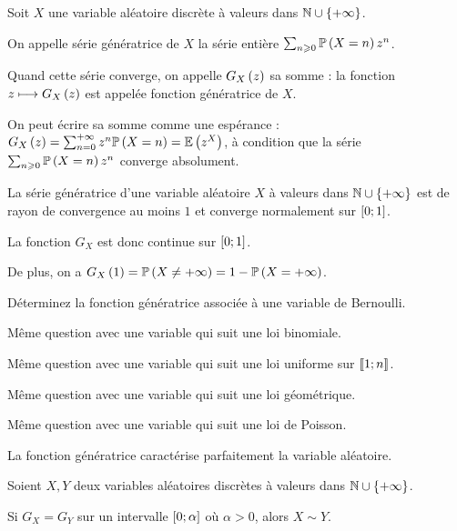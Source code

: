 \begin{defi}
Soit \(X\) une variable aléatoire discrète à valeurs dans \(\mathbb{N}\cup\left\lbrace+\infty\right\rbrace\).

On appelle série génératrice de \(X\) la série entière \(\sum_{n\geqslant0}\mathbb{P}\left(X=n\right)z^n\).

Quand cette série converge, on appelle \(G_X\left(z\right)\) sa somme : la fonction \(z\longmapsto G_X\left(z\right)\) est appelée fonction génératrice de \(X\).
\end{defi}

On peut écrire sa somme comme une espérance : \(G_X\left(z\right)=\sum_{n=0}^{+\infty}z^n\mathbb{P}\left(X=n\right)=\operatorname{\mathbb{E}}\left(z^X\right)\), à condition que la série \(\sum_{n\geqslant0}\mathbb{P}\left(X=n\right)z^n\) converge absolument.

\begin{prop}
La série génératrice d'une variable aléatoire \(X\) à valeurs dans \(\mathbb{N}\cup\left\lbrace+\infty\right\rbrace\) est de rayon de convergence au moins \(1\) et converge normalement sur \(\left[0;1\right]\).

La fonction \(G_X\) est donc continue sur \(\left[0;1\right]\).

De plus, on a \(G_X\left(1\right)=\mathbb{P}\left(X\not=+\infty\right)=1-\mathbb{P}\left(X=+\infty\right)\).
\end{prop}

\begin{exo}
Déterminez la fonction génératrice associée à une variable de Bernoulli.
\end{exo}

\begin{exo}
Même question avec une variable qui suit une loi binomiale.
\end{exo}

\begin{exo}
Même question avec une variable qui suit une loi uniforme sur \(\left\llbracket1;n\right\rrbracket\).
\end{exo}

\begin{exo}
Même question avec une variable qui suit une loi géométrique.
\end{exo}

\begin{exo}
Même question avec une variable qui suit une loi de Poisson.
\end{exo}

La fonction génératrice caractérise parfaitement la variable aléatoire.

\begin{prop}
Soient \(X,Y\) deux variables aléatoires discrètes à valeurs dans \(\mathbb{N}\cup\left\lbrace+\infty\right\rbrace\).

Si \(G_X=G_Y\) sur un intervalle \(\left[0;\alpha\right]\) où \(\alpha>0\), alors \(X\sim Y\).
\end{prop}

